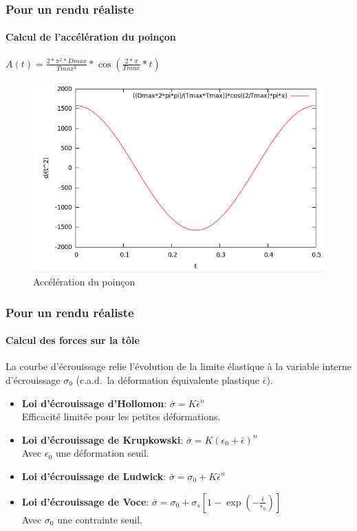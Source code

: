 \documentclass{beamer}
\begin{document}
\begin{frame}
    \frametitle{Pour un rendu réaliste}
    \framesubtitle{Calcul de l'accélération du poinçon}
    \begin{center}
        $A(t) = \frac{2*\pi^2*Dmax}{Tmax^2}*\cos(\frac{2*\pi}{Tmax}*t)$
    \end{center}
    \begin{figure}
        \includegraphics[width=.7\textwidth]{img/acceleration.png}
        \caption{Accélération du poinçon}
        \label{Accélération}
    \end{figure}
\end{frame}
\begin{frame}
    \frametitle{Pour un rendu réaliste}
    \framesubtitle{Calcul des forces sur la tôle}
    La courbe d'écrouissage relie l'évolution de la limite élastique à la variable interne d'écrouissage $\sigma_0$ (c.a.d.\ la déformation équivalente plastique $\bar{\epsilon}$).
    \begin{itemize}
        \item \textbf{Loi d'écrouissage d'Hollomon}:
            $\bar\sigma=K\bar{\epsilon}^n$\\
            {\footnotesize{Efficacité limitée pour les petites déformations.}}
        \item \textbf{Loi d'écrouissage de Krupkowski}:
            $\bar\sigma=K({\epsilon_0+\bar{\epsilon}})^n$\\
            {\footnotesize{Avec $\epsilon_0$ une déformation seuil.}}
        \item \textbf{Loi d'écrouissage de Ludwick}:
            $\bar\sigma=\sigma_0+K{\bar{\epsilon}}^n$
        \item \textbf{Loi d'écrouissage de Voce}:
            $\bar\sigma = \sigma_0 + \sigma_{s} [1-\exp{(-\frac{\bar\epsilon}{\epsilon_0})}]$\\
            {\footnotesize{Avec $\sigma_0$ une contrainte seuil.}}
    \end{itemize}
\end{frame}
\end{document}
